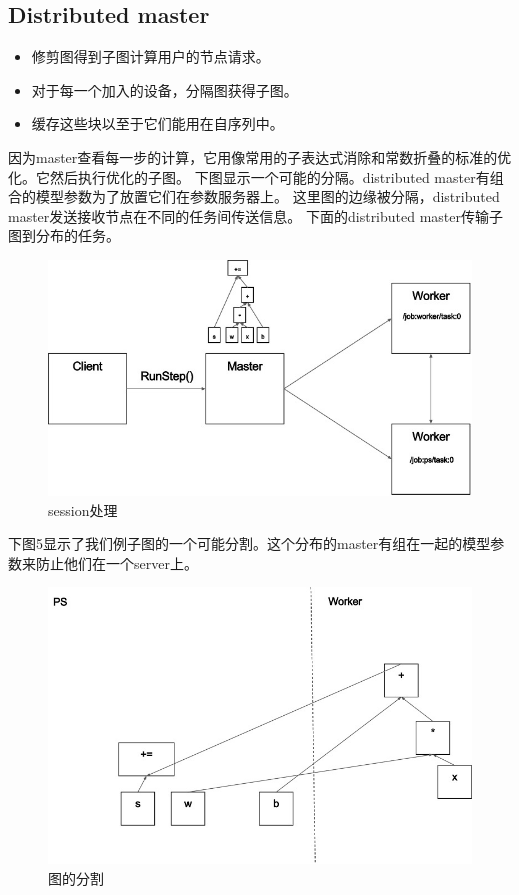 \documentclass{book}
\begin{document}
\subsection{Distributed master}
\begin{itemize}
\item 修剪图得到子图计算用户的节点请求。
\item 对于每一个加入的设备，分隔图获得子图。
\item 缓存这些块以至于它们能用在自序列中。
\end{itemize}
因为master查看每一步的计算，它用像常用的子表达式消除和常数折叠的标准的优化。它然后执行优化的子图。
下图显示一个可能的分隔。distributed master有组合的模型参数为了放置它们在参数服务器上。
这里图的边缘被分隔，distributed master发送接收节点在不同的任务间传送信息。
下面的distributed master传输子图到分布的任务。
\begin{figure}[H]
	\centering 
	\includegraphics[scale=0.5]{graph_master_cln.jpg}
	\caption{session处理}
	\label{fig:tf_ext4}
\end{figure}
下图5显示了我们例子图的一个可能分割。这个分布的master有组在一起的模型参数来防止他们在一个server上。
\begin{figure}[H]
	\centering 
	\includegraphics[scale=0.5]{graph_split1.jpg}
	\caption{图的分割}
	\label{fig:tf_ext5}
\end{figure}
\end{document}
